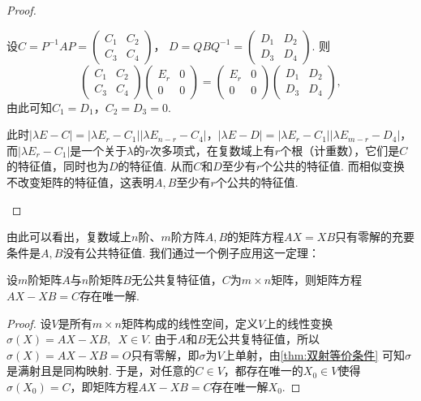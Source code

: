 \begin{proof}
\begin{enumerate}
        设$C=P^{-1}AP=\begin{pmatrix}
            C_1 & C_2 \\
            C_3 & C_4
        \end{pmatrix}$，
        $D=QBQ^{-1}=\begin{pmatrix}
            D_1 & D_2 \\
            D_3 & D_4
        \end{pmatrix}$. 则
        \[\begin{pmatrix}
            C_1 & C_2 \\
            C_3 & C_4
        \end{pmatrix}\begin{pmatrix}
            E_r & 0 \\
            0 & 0
        \end{pmatrix} = \begin{pmatrix}
            E_r & 0 \\
            0 & 0
        \end{pmatrix}\begin{pmatrix}
            D_1 & D_2 \\
            D_3 & D_4
        \end{pmatrix},\]由此可知$C_1=D_1$，$C_2=D_3=0$.

        此时$|\lambda E-C|=|\lambda E_r-C_1||\lambda E_{n-r}-C_4|$，$|\lambda E-D|=|\lambda E_r-C_1||\lambda E_{m-r}-D_4|$，而$|\lambda E_r-C_1|$是一个关于$\lambda$的$r$次多项式，在复数域上有$r$个根（计重数），它们是$C$的特征值，同时也为$D$的特征值. 从而$C$和$D$至少有$r$个公共的特征值. 而相似变换不改变矩阵的特征值，这表明$A,B$至少有$r$个公共的特征值.
    \end{enumerate}
\end{proof}

由此可以看出，复数域上$n$阶、$m$阶方阵$A,B$的矩阵方程$AX=XB$只有零解的充要条件是$A,B$没有公共特征值. 我们通过一个例子应用这一定理：
\begin{example}{}{}
    设$m$阶矩阵$A$与$n$阶矩阵$B$无公共复特征值，$C$为$m\times n$矩阵，则矩阵方程$AX-XB=C$存在唯一解.
\end{example}

\begin{proof}
    设$V$是所有$m\times n$矩阵构成的线性空间，定义$V$上的线性变换$\sigma(X)=AX-XB,\enspace X\in V$. 由于$A$和$B$无公共复特征值，所以$\sigma(X)=AX-XB=O$只有零解，即$\sigma$为$V$上单射，由\autoref{thm:双射等价条件} 可知$\sigma$是满射且是同构映射. 于是，对任意的$C\in V$，都存在唯一的$X_0\in V$使得$\sigma(X_0)=C$，即矩阵方程$AX-XB=C$存在唯一解$X_0$.
\end{proof}

